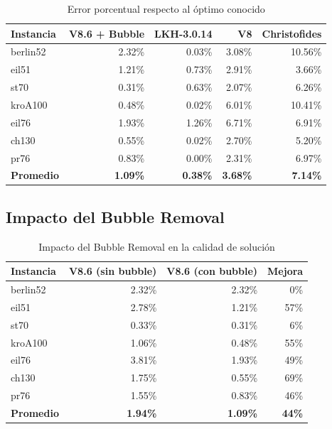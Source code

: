 \documentclass[12pt, a4paper]{article}
\begin{document}
\begin{table}[h]
\centering
\begin{tabular}{lrrrr}
\toprule
\textbf{Instancia} & \textbf{V8.6 + Bubble} & \textbf{LKH-3.0.14} & \textbf{V8} & \textbf{Christofides} \\
\midrule
berlin52 & 2.32\% & 0.03\% & 3.08\% & 10.56\% \\
eil51 & 1.21\% & 0.73\% & 2.91\% & 3.66\% \\
st70 & 0.31\% & 0.63\% & 2.07\% & 6.26\% \\
kroA100 & 0.48\% & 0.02\% & 6.01\% & 10.41\% \\
eil76 & 1.93\% & 1.26\% & 6.71\% & 6.91\% \\
ch130 & 0.55\% & 0.02\% & 2.70\% & 5.20\% \\
pr76 & 0.83\% & 0.00\% & 2.31\% & 6.97\% \\
\midrule
\textbf{Promedio} & \textbf{1.09\%} & \textbf{0.38\%} & \textbf{3.68\%} & \textbf{7.14\%} \\
\bottomrule
\end{tabular}
\caption{Error porcentual respecto al óptimo conocido}
\label{tab:comparison}
\end{table}

\subsection{Impacto del Bubble Removal}

\begin{table}[h]
\centering
\begin{tabular}{lrrr}
\toprule
\textbf{Instancia} & \textbf{V8.6 (sin bubble)} & \textbf{V8.6 (con bubble)} & \textbf{Mejora} \\
\midrule
berlin52 & 2.32\% & 2.32\% & 0\% \\
eil51 & 2.78\% & 1.21\% & 57\% \\
st70 & 0.33\% & 0.31\% & 6\% \\
kroA100 & 1.06\% & 0.48\% & 55\% \\
eil76 & 3.81\% & 1.93\% & 49\% \\
ch130 & 1.75\% & 0.55\% & 69\% \\
pr76 & 1.55\% & 0.83\% & 46\% \\
\midrule
\textbf{Promedio} & \textbf{1.94\%} & \textbf{1.09\%} & \textbf{44\%} \\
\bottomrule
\end{tabular}
\caption{Impacto del Bubble Removal en la calidad de solución}
\label{tab:bubble_impact}
\end{table}
\end{document}
